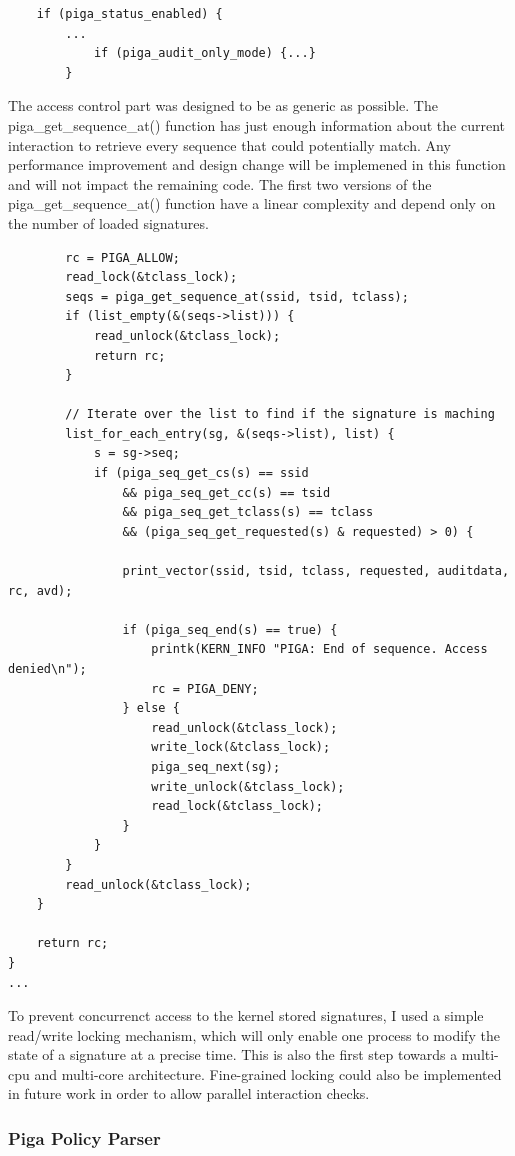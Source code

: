 \documentclass[pdftex,a4paper,titlepage,11pt]{article}
\begin{document}
\begin{lstlisting}
	if (piga_status_enabled) {
		...
			if (piga_audit_only_mode) {...}
		}
\end{lstlisting}

\medskip

The access control part was designed to be as generic as possible. The
piga\_get\_sequence\_at() function has just enough information about the current
interaction to retrieve every sequence that could potentially match. Any
performance improvement and design change will be implemened in this function
and will not impact the remaining code. The first two versions of the
piga\_get\_sequence\_at() function have a linear complexity and depend only on
the number of loaded signatures.

\begin{lstlisting}
		rc = PIGA_ALLOW;
		read_lock(&tclass_lock);
		seqs = piga_get_sequence_at(ssid, tsid, tclass);
		if (list_empty(&(seqs->list))) {
			read_unlock(&tclass_lock);
			return rc;
		}

		// Iterate over the list to find if the signature is maching
		list_for_each_entry(sg, &(seqs->list), list) {
			s = sg->seq;
			if (piga_seq_get_cs(s) == ssid
				&& piga_seq_get_cc(s) == tsid
				&& piga_seq_get_tclass(s) == tclass
				&& (piga_seq_get_requested(s) & requested) > 0) {

				print_vector(ssid, tsid, tclass, requested, auditdata, rc, avd);

				if (piga_seq_end(s) == true) {
					printk(KERN_INFO "PIGA: End of sequence. Access denied\n");
					rc = PIGA_DENY;
				} else {
					read_unlock(&tclass_lock);
					write_lock(&tclass_lock);
					piga_seq_next(sg);
					write_unlock(&tclass_lock);
					read_lock(&tclass_lock);
				}
			}
		}
		read_unlock(&tclass_lock);
	}

	return rc;
}
...
\end{lstlisting}

\medskip

To prevent concurrenct access to the kernel stored signatures, I used a simple
read/write locking mechanism, which will only enable one process to modify the
state of a signature at a precise time. This is also the first step towards a
multi-cpu and multi-core architecture. Fine-grained locking could also be
implemented in future work in order to allow parallel interaction checks.

\subsubsection{Piga Policy Parser}
\end{document}
